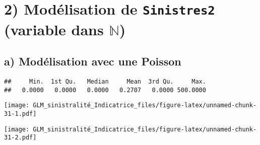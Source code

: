 \documentclass[
]{article}
\newenvironment{Shaded}{\begin{snugshade}}{\end{snugshade}}
\newcommand{\AttributeTok}[1]{\textcolor[rgb]{0.77,0.63,0.00}{#1}}
\newcommand{\DecValTok}[1]{\textcolor[rgb]{0.00,0.00,0.81}{#1}}
\newcommand{\FunctionTok}[1]{\textcolor[rgb]{0.00,0.00,0.00}{#1}}
\newcommand{\NormalTok}[1]{#1}
\newcommand{\OtherTok}[1]{\textcolor[rgb]{0.56,0.35,0.01}{#1}}
\newcommand{\SpecialCharTok}[1]{\textcolor[rgb]{0.00,0.00,0.00}{#1}}
\begin{document}
\hypertarget{moduxe9lisation-de-sinistres2-variable-dans-mathbbn}{%
\section{\texorpdfstring{2) Modélisation de \texttt{Sinistres2}
(variable dans
\(\mathbb{N}\))}{2) Modélisation de Sinistres2 (variable dans \textbackslash mathbb\{N\})}}\label{moduxe9lisation-de-sinistres2-variable-dans-mathbbn}}

\hypertarget{a-moduxe9lisation-avec-une-poisson}{%
\subsection{a) Modélisation avec une
Poisson}\label{a-moduxe9lisation-avec-une-poisson}}

\begin{Shaded}
\end{Shaded}

\begin{verbatim}
##     Min.  1st Qu.   Median     Mean  3rd Qu.     Max. 
##   0.0000   0.0000   0.0000   0.2707   0.0000 500.0000
\end{verbatim}

\begin{Shaded}
\end{Shaded}

\texttt{[image: GLM\_sinistralité\_Indicatrice\_files/figure-latex/unnamed-chunk-31-1.pdf]}

\begin{Shaded}
\end{Shaded}

\texttt{[image: GLM\_sinistralité\_Indicatrice\_files/figure-latex/unnamed-chunk-31-2.pdf]}
\end{document}
